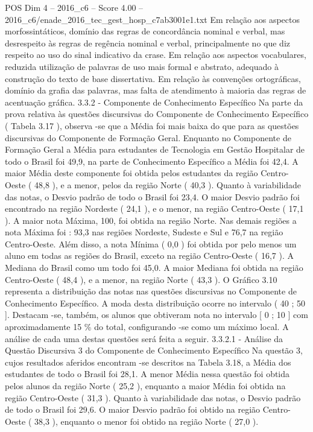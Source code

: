 \begin{textsample}{POS Dim 4 – 2016\_c6 – Score 4.00 – 2016\_c6/enade\_2016\_tec\_gest\_hosp\_c7ab3001e1.txt}
Em relação aos aspectos morfossintáticos, domínio das regras de concordância nominal e verbal, mas desrespeito às regras de regência nominal e verbal, principalmente no que diz respeito ao uso do sinal indicativo da crase.
Em relação aos aspectos vocabulares, reduzida utilização de palavras de uso mais formal e abstrato, adequado à construção do texto de base dissertativa.
Em relação às convenções ortográficas, domínio da grafia das palavras, mas falta de atendimento à maioria das regras de acentuação gráfica. 3.3.2 - Componente de Conhecimento Específico Na parte da prova relativa às questões discursivas do Componente de Conhecimento Específico ( Tabela 3.17 ), observa -se que a Média foi mais baixa do que para as questões discursivas do Componente de Formação Geral.
Enquanto no Componente de Formação Geral a Média para estudantes de Tecnologia em Gestão Hospitalar de todo o Brasil foi 49,9, na parte de Conhecimento Específico a Média foi 42,4.
A maior Média deste componente foi obtida pelos estudantes da região Centro-Oeste ( 48,8 ), e a menor, pelos da região Norte ( 40,3 ).
Quanto à variabilidade das notas, o Desvio padrão de todo o Brasil foi 23,4.
O maior Desvio padrão foi encontrado na região Nordeste ( 24,1 ), e o menor, na região Centro-Oeste ( 17,1 ).
A maior nota Máxima, 100, foi obtida na região Norte.
Nas demais regiões a nota Máxima foi : 93,3 nas regiões Nordeste, Sudeste e Sul e 76,7 na região Centro-Oeste.
Além disso, a nota Mínima ( 0,0 ) foi obtida por pelo menos um aluno em todas as regiões do Brasil, exceto na região Centro-Oeste ( 16,7 ).
A Mediana do Brasil como um todo foi 45,0.
A maior Mediana foi obtida na região Centro-Oeste ( 48,4 ), e a menor, na região Norte ( 43,3 ).
O Gráfico 3.10 representa a distribuição das notas nas questões discursivas no Componente de Conhecimento Específico.
A moda desta distribuição ocorre no intervalo ( 40 ; 50 ].
Destacam -se, também, os alunos que obtiveram nota no intervalo [ 0 ; 10 ] com aproximadamente 15 \% do total, configurando -se como um máximo local.
A análise de cada uma destas questões será feita a seguir. 3.3.2.1 - Análise da Questão Discursiva 3 do Componente de Conhecimento Específico Na questão 3, cujos resultados aferidos encontram -se descritos na Tabela 3.18, a Média dos estudantes de todo o Brasil foi 28,1.
A menor Média nessa questão foi obtida pelos alunos da região Norte ( 25,2 ), enquanto a maior Média foi obtida na região Centro-Oeste ( 31,3 ).
Quanto à variabilidade das notas, o Desvio padrão de todo o Brasil foi 29,6.
O maior Desvio padrão foi obtido na região Centro-Oeste ( 38,3 ), enquanto o menor foi obtido na região Norte ( 27,0 ).

\end{textsample}
